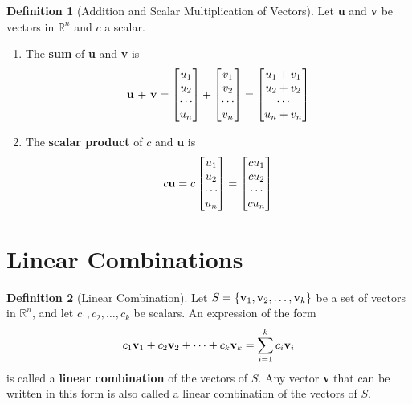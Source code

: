 \documentclass{article}
\renewcommand{\bf}[1]{\textbf{#1}}
\renewcommand{\v}[1]{\boldsymbol{#1}}
\theoremstyle{definition}
\newtheorem{definition}{Definition}
\newcommand{\reals}{\mathbb{R}}
\newcommand{\bmat}[1]{\begin{bmatrix}#1\end{bmatrix}}
\begin{document}
\begin{definition}[Addition and Scalar Multiplication of Vectors]
	Let \bf{u} and \bf{v} be vectors in $\reals^n$ and $c$ a scalar.
	\begin{enumerate}[itemsep=0pt]
		\item The \bf{sum} of \bf{u} and \bf{v} is
		\[ \text{\bf{u} $+$ \bf{v}} = \bmat{u_1\\u_2\\ \cdots \\ u_n} + \bmat{v_1\\v_2\\ \cdots \\ v_n} = \bmat{u_1 + v_1\\u_2 + v_2 \\ \cdots \\ u_n + v_n} \]
		\item The \bf{scalar product} of $c$ and \bf{u} is
		\[ \text{$c$\bf{u}} = c\bmat{u_1\\u_2\\\cdots\\u_n} = \bmat{cu_1\\cu_2\\\cdots\\cu_n} \]
	\end{enumerate}
\end{definition}
\section{Linear Combinations}
\begin{definition}[Linear Combination]
	Let $S = \{ \vb{v}_1, \vb{v}_2, \dots, \vb{v}_k \}$ be a set of vectors in $\reals^n$, and let $c_1, c_2, \dots, c_k$ be scalars. An expression of the form
	\[ c_1\vb{v}_1 + c_2\vb{v}_2 + \cdots + c_k\vb{v}_k = \sum_{i=1}^{k}c_i\vb{v}_i \]
	is called a \bf{linear combination} of the vectors of $S$. Any vector \bf{v} that can be written in this form is also called a linear combination of the vectors of $S$.
\end{definition}
\end{document}
